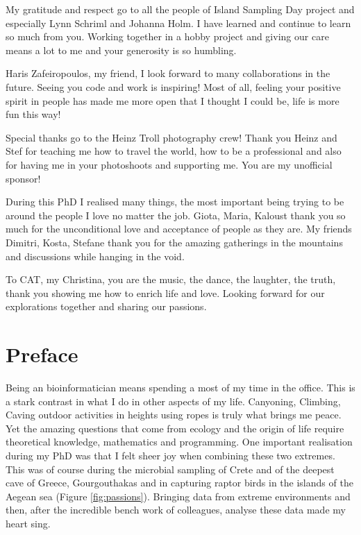 \documentclass[
11pt, %
english, %
singlespacing, %
liststotoc, %
toctotoc, %
headsepline, %
]{MastersDoctoralThesis} %
\begin{document}
\begin{acknowledgements}
My gratitude and respect go to all the people of Island Sampling Day project and especially
Lynn Schriml and Johanna Holm. I have learned and continue to learn so much from 
you. Working together in a hobby project and giving our care means a lot to me and your
generosity is so humbling.

Haris Zafeiropoulos, my friend, I look forward to many collaborations in the future. Seeing you code and work
is inspiring! Most of all, feeling your positive spirit in people has made me more
open that I thought I could be, life is more fun this way!

Special thanks go to the Heinz Troll photography crew! Thank you Heinz and Stef for teaching me 
how to travel the world, how to be a professional and also for having me in your photoshoots and 
supporting me. You are my unofficial sponsor!

During this PhD I realised many things, the most important being trying to be around the people I love no matter the job.
Giota, Maria, Kaloust thank you so much for the unconditional love and acceptance of people as they are.
My friends Dimitri, Kosta, Stefane thank you for the amazing gatherings in the mountains and discussions while 
hanging in the void. 

To CAT, my Christina, you are the music, the dance, the laughter, the truth, thank you showing me 
how to enrich life and love. Looking forward for our explorations together and sharing our passions.

\end{acknowledgements}


\chapter*{Preface}

Being an bioinformatician means spending a most of my time in the office. This is a 
stark contrast in what I do in other aspects of my life. Canyoning, Climbing, Caving 
outdoor activities in heights using ropes is truly what brings me peace. Yet the 
amazing questions that come from ecology and the origin of life require theoretical 
knowledge, mathematics and programming. One important realisation
during my PhD was that I felt sheer joy when combining these two extremes. This was
of course during the microbial sampling of Crete and of the deepest cave of Greece, Gourgouthakas
and in capturing raptor birds in the islands of the Aegean sea (Figure \ref{fig:passions}). Bringing data from 
extreme environments and then, after the incredible bench work of colleagues, analyse 
these data made my heart sing.
\end{document}
